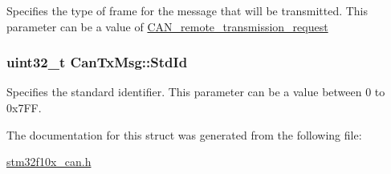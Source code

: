 \label{structCanTxMsg_a69f84255db38c6910058f290efdb7302}
Specifies the type of frame for the message that will be transmitted. This parameter can be a value of \hyperlink{group__CAN__remote__transmission__request}{CAN\_\-remote\_\-transmission\_\-request} \hypertarget{structCanTxMsg_abfb50c8208227f8cf378f29cf9a3a6f3}{
\subsubsection[{StdId}]{\setlength{\rightskip}{0pt plus 5cm}uint32\_\-t {\bf CanTxMsg::StdId}}}
\label{structCanTxMsg_abfb50c8208227f8cf378f29cf9a3a6f3}
Specifies the standard identifier. This parameter can be a value between 0 to 0x7FF. 

The documentation for this struct was generated from the following file:\begin{DoxyCompactItemize}
\item 
\hyperlink{stm32f10x__can_8h}{stm32f10x\_\-can.h}\end{DoxyCompactItemize}
